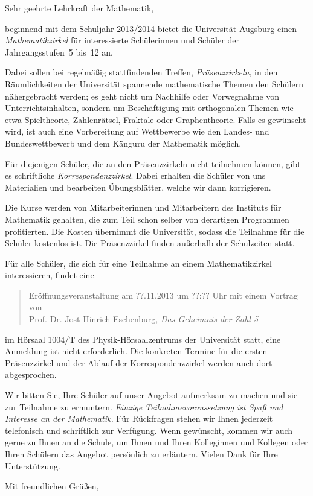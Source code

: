 \documentclass{zirkelbrief}
\begin{document}
\renewcommand{\anschrift}{%
      Holbein-Gymnasium Augsburg \\
      Fachbereich Mathematik \\
      Hallstraße 10 \\
      86150 Augsburg}
\renewcommand{\datum}{2.9.2013}
\renewcommand{\betreff}{Matheschülerzirkel der Universität Augsburg}

\makeletterhead

Sehr geehrte Lehrkraft der Mathematik,

beginnend mit dem Schuljahr 2013/2014 bietet die Universität Augsburg
einen \emph{Mathe\-matik\-zir\-kel} für interessierte Schülerinnen und Schüler der
Jahrgangsstufen~5 bis~12 an.

Dabei sollen bei regelmäßig stattfindenden Treffen, \emph{Präsenzzirkeln}, in
den Räumlichkeiten der Universität spannende mathematische Themen den Schülern
nähergebracht werden; es geht nicht um Nachhilfe oder Vorwegnahme von
Unterrichtsinhalten, sondern um Beschäftigung mit orthogonalen Themen wie etwa
Spieltheorie, Zahlenrätsel, Fraktale oder Graphentheorie. Falls es gewünscht
wird, ist auch eine Vorbereitung auf Wettbewerbe wie den Landes- und
Bundeswettbewerb und dem Känguru der Mathematik möglich.

Für diejenigen Schüler, die an den Präsenzzirkeln nicht teilnehmen können, gibt
es schriftliche \emph{Korrespondenzzirkel}. Dabei erhalten die Schüler von uns
Materialien und bearbeiten Übungsblätter, welche wir dann korrigieren.

Die Kurse werden von Mitarbeiterinnen und Mitarbeitern des
Instituts für Mathematik gehalten, die zum Teil schon selber von derartigen
Programmen profitierten. Die Kosten übernimmt die Universität, sodass die Teilnahme für die Schüler
kostenlos ist. Die Präsenzzirkel finden außerhalb der Schulzeiten
statt.

Für alle Schüler, die sich für eine Teilnahme an einem Mathematikzirkel
interessieren, findet eine
\begin{quote}
    Eröffnungsveranstaltung am ??.11.2013 um ??:?? Uhr mit einem Vortrag von \\
    Prof. Dr. Jost-Hinrich Eschenburg, \emph{Das
    Geheimnis der Zahl 5}
\end{quote}
im Hörsaal 1004/T des Physik-Hörsaalzentrums der Universität statt, eine
Anmeldung ist nicht erforderlich. Die konkreten Termine für die
ersten Präsenzzirkel und der Ablauf der Korrespondenzzirkel werden auch dort
abgesprochen.

Wir bitten Sie, Ihre Schüler auf unser Angebot aufmerksam zu machen und sie zur
Teilnahme zu ermuntern. \emph{Einzige Teilnahmevoraussetzung ist Spaß und
Interesse an der Mathematik.} Für Rückfragen stehen wir Ihnen jederzeit
telefonisch und schriftlich zur Verfügung. Wenn gewünscht, kommen wir auch
gerne zu Ihnen an die Schule, um Ihnen und Ihren Kolleginnen und Kollegen oder
Ihren Schülern das Angebot persönlich zu erläutern. Vielen Dank für Ihre
Unterstützung.

Mit freundlichen Grüßen,
\end{document}
